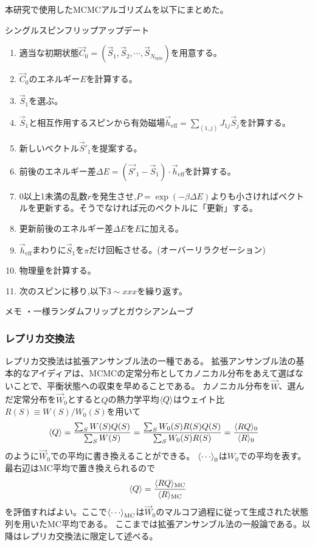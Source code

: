 \documentclass[12pt,titlepage,dvipdfmx]{jarticle}
\begin{document}
本研究で使用したMCMCアルゴリズムを以下にまとめた。

\begin{itembox}[1]{シングルスピンフリップアップデート}
   \begin{enumerate}
       \item 適当な初期状態$\vec{C}_0=(\vec{S}_1,\vec{S}_2,\cdots,\vec{S}_{N_{\mathrm{spin}}})$を用意する。
       \item $\vec{C}_0$のエネルギー$E$を計算する。
       \item $\vec{S}_1$を選ぶ。
       \item $\vec{S}_1$と相互作用するスピンから有効磁場$\vec{h}_{\mathrm{eff}} = \sum _{(1,j)}J_{1j}\vec{S}_j$を計算する。
       \item 新しいベクトル$\vec{S}'_1$を提案する。
       \item 前後のエネルギー差$\Delta E = (\vec{S'}_1 - \vec{S}_1) \cdot \vec{h}_{\mathrm{eff}}$を計算する。
       \item 0以上1未満の乱数$r$を発生させ,$P = \exp(-\beta \Delta E)$よりも小さければベクトルを更新する。そうでなければ元のベクトルに「更新」する。
       \item 更新前後のエネルギー差$\Delta E$を$E$に加える。
       \item $\vec{h}_{\mathrm{eff}}$まわりに$\vec{S}_1$を$\pi$だけ回転させる。(オーバーリラクゼーション)
       \item 物理量を計算する。
       \item 次のスピンに移り,以下$3\sim xxx$を繰り返す。
   \end{enumerate}
\end{itembox}

メモ
・一様ランダムフリップとガウシアンムーブ

\subsubsection{レプリカ交換法}

レプリカ交換法は拡張アンサンブル法の一種である。
拡張アンサンブル法の基本的なアイディアは、MCMCの定常分布としてカノニカル分布をあえて選ばないことで、平衡状態への収束を早めることである。
カノニカル分布を$\vec{W}$、選んだ定常分布を$\vec{W}_0$とすると$Q$の熱力学平均$\ev{Q}$はウェイト比$R(S) \equiv W(S)/W_0(S)$を用いて
\begin{align}
\ev{Q} &= \frac{\sum_S W(S)Q(S)}{\sum_S W(S)} = \frac{\sum_S W_0(S)R(S)Q(S)}{\sum_S W_0(S)R(S)}=\frac{\langle RQ \rangle_{0}}{\langle R
\rangle_{0}}    
\end{align}
のように$\vec{W}_0$での平均に書き換えることができる。
$\ev{\cdots}_0$は$W_0$での平均を表す。最右辺はMC平均で置き換えられるので
\begin{align}
\ev{Q} = \frac{\langle R Q \rangle_{\rm MC}}{\langle R \rangle_{\rm MC}}
\end{align}
を評価すればよい。ここで$\ev{\cdots}_{\mathrm{MC}}$は$\vec{W}_0$のマルコフ過程に従って生成された状態列を用いたMC平均である。
ここまでは拡張アンサンブル法の一般論である。以降はレプリカ交換法に限定して述べる。
\end{document}
